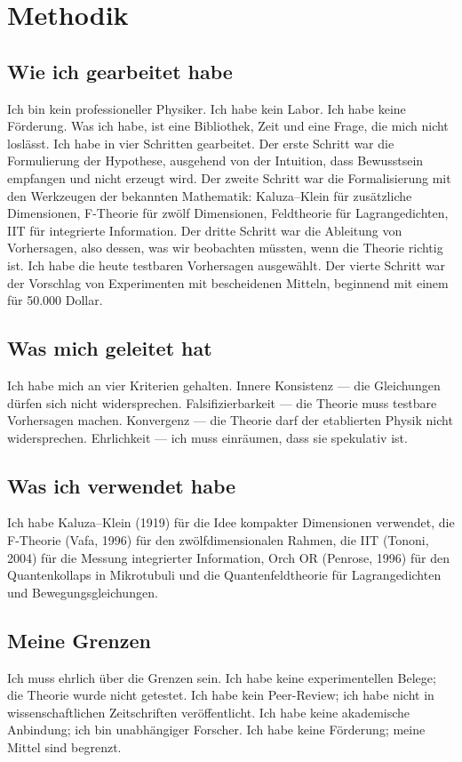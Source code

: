\section{Methodik}
\subsection{Wie ich gearbeitet habe}
Ich bin kein professioneller Physiker. Ich habe kein Labor. Ich habe keine Förderung. Was ich habe, ist eine Bibliothek, Zeit und eine Frage, die mich nicht loslässt. Ich habe in vier Schritten gearbeitet. Der erste Schritt war die Formulierung der Hypothese, ausgehend von der Intuition, dass Bewusstsein empfangen und nicht erzeugt wird. Der zweite Schritt war die Formalisierung mit den Werkzeugen der bekannten Mathematik: Kaluza--Klein für zusätzliche Dimensionen, F-Theorie für zwölf Dimensionen, Feldtheorie für Lagrangedichten, IIT für integrierte Information. Der dritte Schritt war die Ableitung von Vorhersagen, also dessen, was wir beobachten müssten, wenn die Theorie richtig ist. Ich habe die heute testbaren Vorhersagen ausgewählt. Der vierte Schritt war der Vorschlag von Experimenten mit bescheidenen Mitteln, beginnend mit einem für 50.000 Dollar.

\subsection{Was mich geleitet hat}
Ich habe mich an vier Kriterien gehalten. Innere Konsistenz --- die Gleichungen dürfen sich nicht widersprechen. Falsifizierbarkeit --- die Theorie muss testbare Vorhersagen machen. Konvergenz --- die Theorie darf der etablierten Physik nicht widersprechen. Ehrlichkeit --- ich muss einräumen, dass sie spekulativ ist.

\subsection{Was ich verwendet habe}
Ich habe Kaluza--Klein (1919) für die Idee kompakter Dimensionen verwendet, die F-Theorie (Vafa, 1996) für den zwölfdimensionalen Rahmen, die IIT (Tononi, 2004) für die Messung integrierter Information, Orch OR (Penrose, 1996) für den Quantenkollaps in Mikrotubuli und die Quantenfeldtheorie für Lagrangedichten und Bewegungsgleichungen.

\subsection{Meine Grenzen}
Ich muss ehrlich über die Grenzen sein. Ich habe keine experimentellen Belege; die Theorie wurde nicht getestet. Ich habe kein Peer-Review; ich habe nicht in wissenschaftlichen Zeitschriften veröffentlicht. Ich habe keine akademische Anbindung; ich bin unabhängiger Forscher. Ich habe keine Förderung; meine Mittel sind begrenzt.
